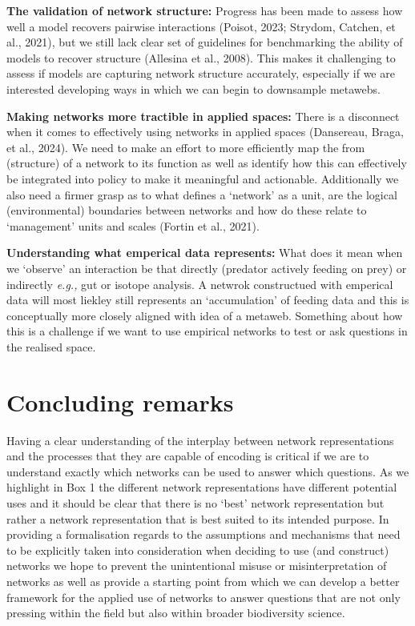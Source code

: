 \documentclass[
]{article}
\begin{document}
\textbf{The validation of network structure:} Progress has been made to
assess how well a model recovers pairwise interactions (Poisot, 2023;
Strydom, Catchen, et al., 2021), but we still lack clear set of
guidelines for benchmarking the ability of models to recover structure
(Allesina et al., 2008). This makes it challenging to assess if models
are capturing network structure accurately, especially if we are
interested developing ways in which we can begin to downsample metawebs.

\textbf{Making networks more tractible in applied spaces:} There is a
disconnect when it comes to effectively using networks in applied spaces
(Dansereau, Braga, et al., 2024). We need to make an effort to more
efficiently map the from (structure) of a network to its function as
well as identify how this can effectively be integrated into policy to
make it meaningful and actionable. Additionally we also need a firmer
grasp as to what defines a `network' as a unit, are the logical
(environmental) boundaries between networks and how do these relate to
`management' units and scales (Fortin et al., 2021).

\textbf{Understanding what emperical data represents:} What does it mean
when we `observe' an interaction be that directly (predator actively
feeding on prey) or indirectly \emph{e.g.,} gut or isotope analysis. A
netwrok constructued with emperical data will most liekley still
represents an `accumulation' of feeding data and this is conceptually
more closely aligned with idea of a metaweb. Something about how this is
a challenge if we want to use empirical networks to test or ask
questions in the realised space.

\section{Concluding remarks}\label{concluding-remarks}

Having a clear understanding of the interplay between network
representations and the processes that they are capable of encoding is
critical if we are to understand exactly which networks can be used to
answer which questions. As we highlight in Box 1 the different network
representations have different potential uses and it should be clear
that there is no `best' network representation but rather a network
representation that is best suited to its intended purpose. In providing
a formalisation regards to the assumptions and mechanisms that need to
be explicitly taken into consideration when deciding to use (and
construct) networks we hope to prevent the unintentional misuse or
misinterpretation of networks as well as provide a starting point from
which we can develop a better framework for the applied use of networks
to answer questions that are not only pressing within the field but also
within broader biodiversity science.
\end{document}
